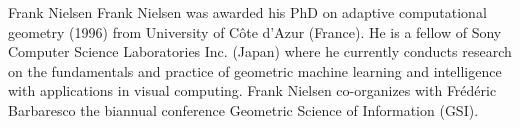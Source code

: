 \documentclass[journal]{IEEEtran}
\begin{document}


%
%
%










% 

\begin{IEEEbiographynophoto}{Frank Nielsen}
Frank Nielsen was awarded his PhD on adaptive computational geometry (1996) from University of C\^ote d'Azur (France). 
He is a fellow of Sony Computer Science Laboratories Inc. (Japan) where he currently conducts research on 
the fundamentals and practice of geometric machine learning and intelligence with applications in visual computing. 
Frank Nielsen co-organizes with Fr\'ed\'eric Barbaresco the biannual conference Geometric Science of Information (GSI). 
\end{IEEEbiographynophoto}
\end{document}
